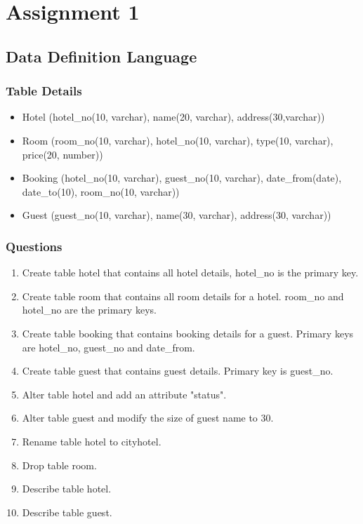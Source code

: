 \section{Assignment 1}

\subsection{Data Definition Language}

\subsubsection{Table Details}

\begin{itemize}
\item
  Hotel (hotel\_no(10, varchar), name(20, varchar), address(30,varchar))
\item
  Room (room\_no(10, varchar), hotel\_no(10, varchar), type(10,
  varchar), price(20, number))
\item
  Booking (hotel\_no(10, varchar), guest\_no(10, varchar),
  date\_from(date), date\_to(10), room\_no(10, varchar))
\item
  Guest (guest\_no(10, varchar), name(30, varchar), address(30,
  varchar))
\end{itemize}

\subsubsection{Questions}

\begin{enumerate}
\item
  Create table hotel that contains all hotel details, hotel\_no is the
  primary key.
\item
  Create table room that contains all room details for a hotel. room\_no
  and hotel\_no are the primary keys.
\item
  Create table booking that contains booking details for a guest.
  Primary keys are hotel\_no, guest\_no and date\_from.
\item
  Create table guest that contains guest details. Primary key is
  guest\_no.
\item
  Alter table hotel and add an attribute "status".
\item
  Alter table guest and modify the size of guest name to 30.
\item
  Rename table hotel to cityhotel.
\item
  Drop table room.
\item
  Describe table hotel.
\item
  Describe table guest.
\end{enumerate}
